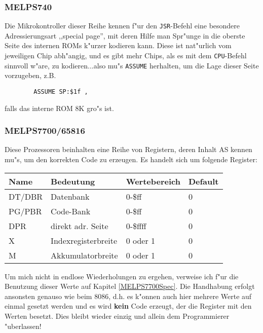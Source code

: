 \documentclass[12pt,a4paper,twoside]{report}
\newcommand{\bb}[1]{{\bf #1}}
\newcommand{\tty}[1]{{\tt #1}}
\begin{document}
{%

\subsubsection{MELPS740}

Die Mikrokontroller dieser Reihe kennen f"ur den \tty{JSR}-Befehl eine
besondere Adressierungsart ,,special page'', mit deren Hilfe man Spr"unge
in die oberste Seite des internen ROMs k"urzer kodieren kann.  Diese
ist nat"urlich vom jeweiligen Chip abh"angig, und es gibt mehr Chips,
als es mit dem \tty{CPU}-Befehl sinnvoll w"are, zu kodieren...also mu"s
\tty{ASSUME} herhalten, um die Lage dieser Seite vorzugeben, z.B.
\begin{verbatim}
        ASSUME SP:$1f ,
\end{verbatim}
falls das interne ROM 8K gro"s ist.


\subsubsection{MELPS7700/65816}

Diese Prozessoren beinhalten eine Reihe von Registern, deren Inhalt AS
kennen mu"s, um den korrekten Code zu erzeugen.  Es handelt sich um folgende
Register:
\begin{center}\begin{tabular}{|l|l|l|l|}
\hline
Name  & Bedeutung           & Wertebereich & Default\\
\hline
\hline
DT/DBR & Datenbank           & 0-\$ff       & 0 \\
PG/PBR & Code-Bank           & 0-\$ff       & 0 \\
DPR   & direkt adr. Seite   & 0-\$ffff     & 0 \\
X     & Indexregisterbreite & 0 oder 1     & 0 \\
M     & Akkumulatorbreite   & 0 oder 1     & 0 \\
\hline
\end{tabular}\end{center}
\par
Um mich nicht in endlose Wiederholungen zu ergehen, verweise ich f"ur die
Benutzung dieser Werte auf Kapitel \ref{MELPS7700Spec}.  Die Handhabung
erfolgt ansonsten genauso wie beim 8086, d.h. es k"onnen auch hier mehrere
Werte auf einmal gesetzt werden und es wird \bb{kein} Code erzeugt, der
die Register mit den Werten besetzt.  Dies bleibt wieder einzig und allein
dem Programmierer "uberlassen!

}
\end{document}
